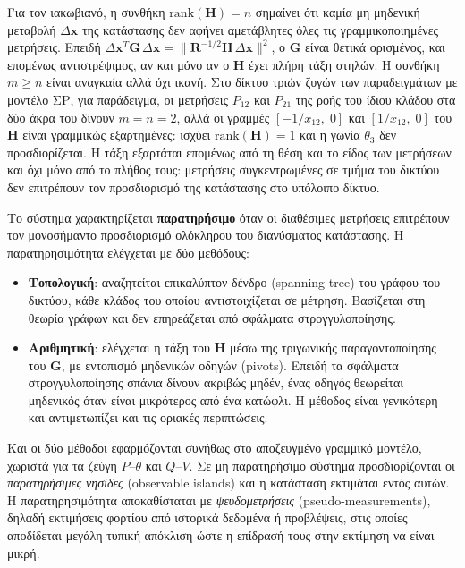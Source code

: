 Για τον ιακωβιανό, η συνθήκη $\mathrm{rank}(\mathbf{H}) = n$ σημαίνει ότι καμία μη μηδενική
μεταβολή $\Delta\mathbf{x}$ της κατάστασης δεν αφήνει αμετάβλητες όλες τις γραμμικοποιημένες
μετρήσεις. Επειδή
$\Delta\mathbf{x}^{T}\mathbf{G}\,\Delta\mathbf{x} = \|\mathbf{R}^{-1/2}\mathbf{H}\,\Delta\mathbf{x}\|^{2}$,
ο $\mathbf{G}$ είναι θετικά ορισμένος, και επομένως αντιστρέψιμος, αν και μόνο αν ο
$\mathbf{H}$ έχει πλήρη τάξη στηλών. Η συνθήκη $m \ge n$ είναι αναγκαία αλλά όχι ικανή. Στο
δίκτυο τριών ζυγών των παραδειγμάτων με μοντέλο ΣΡ, για παράδειγμα, οι μετρήσεις $P_{12}$ και
$P_{21}$ της ροής του ίδιου κλάδου στα δύο άκρα του δίνουν $m = n = 2$, αλλά οι γραμμές
$[-1/x_{12},\; 0]$ και $[1/x_{12},\; 0]$ του $\mathbf{H}$ είναι γραμμικώς εξαρτημένες: ισχύει
$\mathrm{rank}(\mathbf{H}) = 1$ και η γωνία $\theta_3$ δεν προσδιορίζεται. Η τάξη εξαρτάται
επομένως από τη θέση και το είδος των μετρήσεων και όχι μόνο από το πλήθος τους: μετρήσεις
συγκεντρωμένες σε τμήμα του δικτύου δεν επιτρέπουν τον προσδιορισμό της κατάστασης στο
υπόλοιπο δίκτυο.

Το σύστημα χαρακτηρίζεται \textbf{παρατηρήσιμο} όταν οι διαθέσιμες μετρήσεις επιτρέπουν τον
μονοσήμαντο προσδιορισμό ολόκληρου του διανύσματος κατάστασης. Η παρατηρησιμότητα ελέγχεται
με δύο μεθόδους:

\begin{itemize}
\item \textbf{Τοπολογική}: αναζητείται επικαλύπτον δένδρο (spanning tree) του γράφου του
      δικτύου, κάθε κλάδος του οποίου αντιστοιχίζεται σε μέτρηση. Βασίζεται στη θεωρία
      γράφων και δεν επηρεάζεται από σφάλματα στρογγυλοποίησης.
\item \textbf{Αριθμητική}: ελέγχεται η τάξη του $\mathbf{H}$ μέσω της τριγωνικής
      παραγοντοποίησης του $\mathbf{G}$, με εντοπισμό μηδενικών οδηγών (pivots). Επειδή τα
      σφάλματα στρογγυλοποίησης σπάνια δίνουν ακριβώς μηδέν, ένας οδηγός θεωρείται μηδενικός
      όταν είναι μικρότερος από ένα κατώφλι. Η μέθοδος είναι γενικότερη και αντιμετωπίζει και
      τις οριακές περιπτώσεις.
\end{itemize}

Και οι δύο μέθοδοι εφαρμόζονται συνήθως στο αποζευγμένο γραμμικό μοντέλο, χωριστά για τα
ζεύγη $P$--$\theta$ και $Q$--$V$. Σε μη παρατηρήσιμο σύστημα προσδιορίζονται οι
\emph{παρατηρήσιμες νησίδες} (observable islands) και η κατάσταση εκτιμάται εντός αυτών. Η
παρατηρησιμότητα αποκαθίσταται με \emph{ψευδομετρήσεις} (pseudo-measurements), δηλαδή
εκτιμήσεις φορτίου από ιστορικά δεδομένα ή προβλέψεις, στις οποίες αποδίδεται μεγάλη τυπική
απόκλιση ώστε η επίδρασή τους στην εκτίμηση να είναι μικρή.

